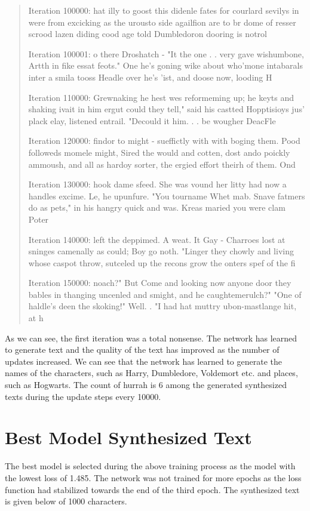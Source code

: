 \documentclass[11pt]{article}
\begin{document}
\begin{quote}
Iteration 100000:
 hat illy to goost this didenle fates for courlard sevilys in were from excicking as the urousto side agailfion are to br dome of resser scrood lazen diding cood age told Dumbledoron dooring is notrol

Iteration 100001:
o there Droshatch - "It the one . . very gave wishumbone, Artth in fike essat feots."
One he's goning wike about who'mone intabarals inter a smila tooss Headle over he's 'ist, and doose now, looding H

Iteration 110000:
Grewnaking he hest wes reformeming up; he keyts and shaking ivait in him ergut could they tell," said his castted Hopptisioys jus' plack elay, listened entrail.
"Decould it him. . . be wougher DeacFle

Iteration 120000:
findor to might - sueffictly with with boging them.
Pood followeds momele might, Sired the would and cotten, dost ando poickly ammoush, and all as hardoy sorter, the ergied effort theirh of them.
Ond 

Iteration 130000:
hook dame sfeed.  She was vound her litty had now a handles excime.  Le, he upunfure.  "You tourname Whet mab.  Snave fatmers do as pets," in his hangry quick and was. Kreas maried you were clam Poter

Iteration 140000:
left the deppimed.  A weat.  It Gay - Charroes lost at sninges camenally as could; Boy go noth. "Linger they chowly and living whose caspot throw, sutceled up the recons grow the onters spef of the fi

Iteration 150000:
noach?"
But Come and looking now anyone door they bables in thanging uncenled and smight, and he caughtemerulch?"
"One of haldle's deen the skoking!"
Well. .
"I had hat muttry ubon-mastlange hit, at h
\end{quote}


As we can see, the first iteration was a total nonsense. The network has learned to generate text and the quality of the text has improved as the number of updates increased.
We can see that the network has learned to generate the names of the characters, such as Harry, Dumbledore, Voldemort etc. and places, such as Hogwarts. 
The count of hurrah is 6 among the generated synthesized texts during the update steps every 10000.


\section*{Best Model Synthesized Text}

The best model is selected during the above training process as the model with the lowest loss of 1.485. 
The network was not trained for more epochs as the loss function had stabilized towards the end of the third epoch.
The synthesized text is given below of 1000 characters.
\end{document}
